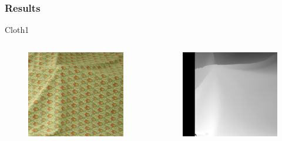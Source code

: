 \documentclass{beamer}
\begin{document}
\begin{frame}
\frametitle{Results}
Cloth1
\begin{columns}[c] %

\begin{figure}
\includegraphics[width=0.7\linewidth]{../program/dataset/Cloth1/view1.png}
\end{figure}

\begin{figure}
\includegraphics[width=0.7\linewidth]{../program/Result/Cloth1.png}
\end{figure}

\end{columns}
\end{frame}

\end{document}
